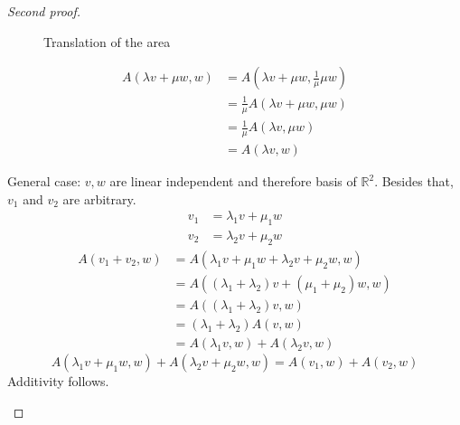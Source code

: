 \documentclass[a4paper,landscape,twocolumn]{article}
\begin{document}
\begin{proof}[Second proof]
\begin{enumerate}
\begin{figure}[!h]
\begin{center}
          \caption{Translation of the area}
        \end{center}
      \end{figure}
      \begin{align*}
        A(\lambda v + \mu w, w)
          &= A(\lambda v + \mu w, \frac{1}{\mu} \mu w) \\
          &= \frac1\mu A(\lambda v + \mu w, \mu w) \\
          &= \frac{1}{\mu} A(\lambda v, \mu w) \\
          &= A(\lambda v, w)
      \end{align*}

      General case: $v, w$ are linear independent and therefore basis of $\mathbb R^2$.
      Besides that, $v_1$ and $v_2$ are arbitrary.
      \begin{align*}
        v_1 &= \lambda_1 v + \mu_1 w \\
        v_2 &= \lambda_2 v + \mu_2 w
      \end{align*}
      \begin{align*}
        A(v_1 + v_2, w)
          &= A(\lambda_1 v + \mu_1 w + \lambda_2 v + \mu_2 w, w) \\
          &= A((\lambda_1 + \lambda_2) v + (\mu_1 + \mu_2) w, w) \\
          &= A((\lambda_1 + \lambda_2) v, w) \\
          &= (\lambda_1 + \lambda_2) A(v, w) \\
          &= A(\lambda_1 v, w) + A(\lambda_2 v, w)
      \end{align*}
      \[ A(\lambda_1 v + \mu_1 w, w) + A(\lambda_2 v + \mu_2 w, w) = A(v_1, w) + A(v_2, w) \]
      Additivity follows.
  \end{enumerate}
\end{proof}
\end{document}
